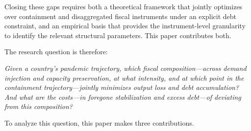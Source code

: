 Closing these gaps requires both a theoretical framework that jointly optimizes over containment and disaggregated fiscal instruments under an explicit debt constraint, and an empirical basis that provides the instrument-level granularity to identify the relevant structural parameters. This paper contributes both.

The research question is therefore:

\medskip
\noindent\textit{Given a country's pandemic trajectory, which fiscal composition---across demand injection and capacity preservation, at what intensity, and at which point in the containment trajectory---jointly minimizes output loss and debt accumulation? And what are the costs---in foregone stabilization and excess
debt---of deviating from this composition?}



To analyze this question, this paper makes three contributions.

